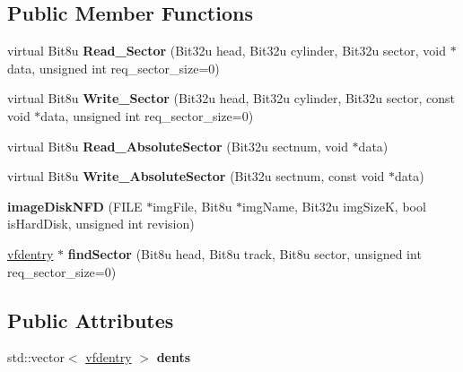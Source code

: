 \subsection*{Public Member Functions}
\begin{DoxyCompactItemize}
\item 
\hypertarget{classimageDiskNFD_a68592ca82b6289dac88f11496b1786d1}{virtual Bit8u {\bfseries Read\-\_\-\-Sector} (Bit32u head, Bit32u cylinder, Bit32u sector, void $\ast$data, unsigned int req\-\_\-sector\-\_\-size=0)}\label{classimageDiskNFD_a68592ca82b6289dac88f11496b1786d1}

\item 
\hypertarget{classimageDiskNFD_a29a3ca3ba569ad27e53736b4bdbdf6a7}{virtual Bit8u {\bfseries Write\-\_\-\-Sector} (Bit32u head, Bit32u cylinder, Bit32u sector, const void $\ast$data, unsigned int req\-\_\-sector\-\_\-size=0)}\label{classimageDiskNFD_a29a3ca3ba569ad27e53736b4bdbdf6a7}

\item 
\hypertarget{classimageDiskNFD_a3ff96b9c95f7e612a8defb028ea7d926}{virtual Bit8u {\bfseries Read\-\_\-\-Absolute\-Sector} (Bit32u sectnum, void $\ast$data)}\label{classimageDiskNFD_a3ff96b9c95f7e612a8defb028ea7d926}

\item 
\hypertarget{classimageDiskNFD_ac5a037cce6076f95d27a1b8c25f3695b}{virtual Bit8u {\bfseries Write\-\_\-\-Absolute\-Sector} (Bit32u sectnum, const void $\ast$data)}\label{classimageDiskNFD_ac5a037cce6076f95d27a1b8c25f3695b}

\item 
\hypertarget{classimageDiskNFD_ab1affe8de7578d8e5a0699b4029b4b33}{{\bfseries image\-Disk\-N\-F\-D} (F\-I\-L\-E $\ast$img\-File, Bit8u $\ast$img\-Name, Bit32u img\-Size\-K, bool is\-Hard\-Disk, unsigned int revision)}\label{classimageDiskNFD_ab1affe8de7578d8e5a0699b4029b4b33}

\item 
\hypertarget{classimageDiskNFD_aa4e6f7762a0c622d8c829a7bdf179f66}{\hyperlink{structimageDiskNFD_1_1vfdentry}{vfdentry} $\ast$ {\bfseries find\-Sector} (Bit8u head, Bit8u track, Bit8u sector, unsigned int req\-\_\-sector\-\_\-size=0)}\label{classimageDiskNFD_aa4e6f7762a0c622d8c829a7bdf179f66}

\end{DoxyCompactItemize}
\subsection*{Public Attributes}
\begin{DoxyCompactItemize}
\item 
\hypertarget{classimageDiskNFD_a5a8485ee6b315c4d0a77e5443d9d1e2f}{std\-::vector$<$ \hyperlink{structimageDiskNFD_1_1vfdentry}{vfdentry} $>$ {\bfseries dents}}\label{classimageDiskNFD_a5a8485ee6b315c4d0a77e5443d9d1e2f}

\end{DoxyCompactItemize}


